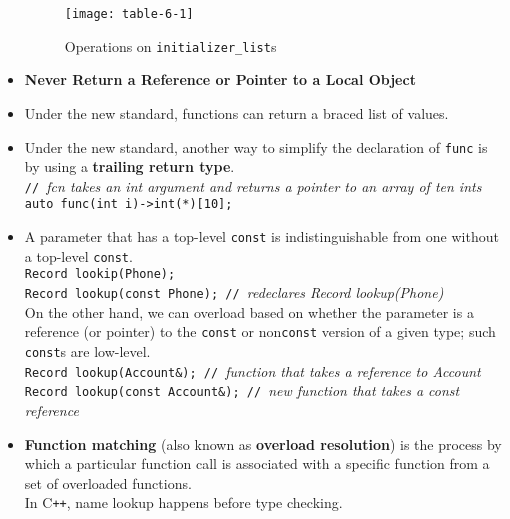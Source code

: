 \begin{itemize}
\begin{figure}[ht]
\texttt{[image: table-6-1]}
\centering
\caption{Operations on \texttt{initializer\_list}s}
\end{figure}

\item
\textbf{Never Return a Reference or Pointer to a Local Object}

\item
Under the new standard, functions can return a braced list of values.

\item
Under the new standard, another way to simplify the declaration of \texttt{func} is by using a \textbf{trailing return type}.\\
\hspace*{1em}\texttt{// }\textit{fcn takes an int argument and returns a pointer to an array of ten ints}\\
\hspace*{1em}\texttt{auto func(int i)->int(*)[10];}

\item
A parameter that has a top-level \texttt{const} is indistinguishable from one without a top-level \texttt{const}.\\
\hspace*{1em}\texttt{Record lookip(Phone);}\\
\hspace*{1em}\texttt{Record lookup(const Phone); // }\textit{redeclares Record lookup(Phone)}\\
On the other hand, we can overload based on whether the parameter is a reference (or pointer) to the \texttt{const} or non\texttt{const} version of a given type; such \texttt{const}s are low-level.\\
\hspace*{1em}\texttt{Record lookup(Account\&); // }\textit{function that takes a reference to Account}\\
\hspace*{1em}\texttt{Record lookup(const Account\&); // }\textit{new function that takes a const reference}

\item
\textbf{Function matching} (also known as \textbf{overload resolution}) is the process by which a particular function call is associated with a specific function from a set of overloaded functions.\\
In C\texttt{++}, name lookup happens before type checking.


\end{itemize}
